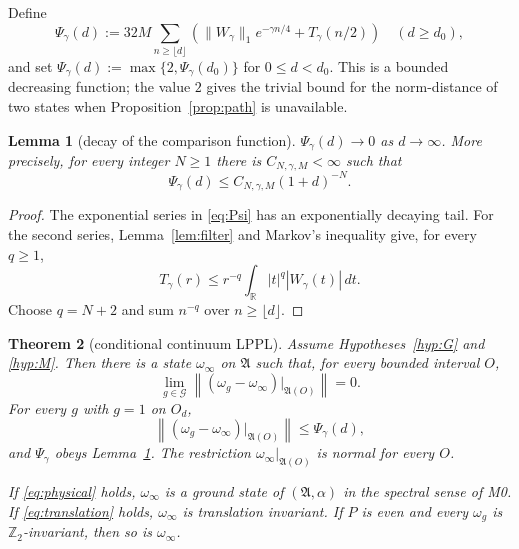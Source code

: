 \documentclass[11pt,a4paper]{article}
\newtheorem{theorem}{Theorem}[section]
\newtheorem{lemma}[theorem]{Lemma}
\theoremstyle{remark}
\newcommand{\R}{\mathbb R}
\newcommand{\A}{\mathfrak A}
\newcommand{\G}{\mathcal G}
\begin{document}
Define
\begin{equation}\label{eq:Psi}
 \Psi_\gamma(d):=32M\sum_{n\ge\lfloor d\rfloor}
 \left(\|W_\gamma\|_1e^{-\gamma n/4}+T_\gamma(n/2)\right)
 \quad(d\ge d_0),
\end{equation}
and set $\Psi_\gamma(d):=\max\{2,\Psi_\gamma(d_0)\}$ for $0\le d<d_0$.  This is a bounded
decreasing function; the value $2$ gives the trivial bound for the norm-distance of two states
when Proposition~\ref{prop:path} is unavailable.

\begin{lemma}[decay of the comparison function]\label{lem:Psitail}
$\Psi_\gamma(d)\to0$ as $d\to\infty$.  More precisely, for every integer $N\ge1$ there is
$C_{N,\gamma,M}<\infty$ such that
\[
 \Psi_\gamma(d)\le C_{N,\gamma,M}(1+d)^{-N}.
\]
\end{lemma}

\begin{proof}
The exponential series in \eqref{eq:Psi} has an exponentially decaying tail.  For the second
series, Lemma~\ref{lem:filter} and Markov's inequality give, for every $q\ge1$,
\[
 T_\gamma(r)\le r^{-q}\int_\R|t|^q|W_\gamma(t)|\,dt.
\]
Choose $q=N+2$ and sum $n^{-q}$ over $n\ge\lfloor d\rfloor$.
\end{proof}

\begin{theorem}[conditional continuum LPPL]\label{thm:main}
Assume Hypotheses~\ref{hyp:G} and \ref{hyp:M}.  Then there is a state $\omega_\infty$ on $\A$ such
that, for every bounded interval $O$,
\[
 \lim_{g\in\G}\left\|(\omega_g-\omega_\infty)|_{\A(O)}\right\|=0.
\]
For every $g$ with $g=1$ on $O_d$,
\begin{equation}\label{eq:limit-rate}
 \left\|(\omega_g-\omega_\infty)|_{\A(O)}\right\|
 \le\Psi_\gamma(d),
\end{equation}
and $\Psi_\gamma$ obeys Lemma~\ref{lem:Psitail}.  The restriction
$\omega_\infty|_{\A(O)}$ is normal for every $O$.

If \eqref{eq:physical} holds, $\omega_\infty$ is a ground state of $(\A,\alpha)$ in the spectral
sense of M0.  If \eqref{eq:translation} holds, $\omega_\infty$ is translation invariant.  If $P$
is even and every $\omega_g$ is $\mathbb Z_2$-invariant, then so is $\omega_\infty$.
\end{theorem}
\end{document}
